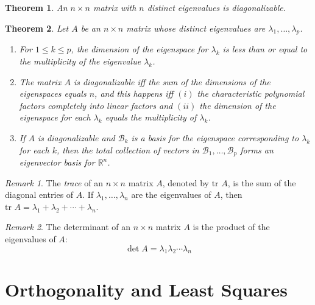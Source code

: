 \documentclass{article}
\theoremstyle{plain}
\newtheorem{thm}{Theorem}[section]
\theoremstyle{definition}
\theoremstyle{remark}
\newtheorem*{rem}{Remark}
\begin{document}
\begin{thm}
    An \(n\times n\) matrix with \(n\) distinct eigenvalues is diagonalizable.
\end{thm}

\begin{thm}
    Let \(A\) be an \(n\times n\) matrix whose distinct eigenvalues are \(\lambda_1,\ldots,\lambda_p\).
    \begin{enumerate}
        \item[a.] For \(1\leq k\leq p\), the dimension of the eigenspace for \(\lambda_k\) is less than or equal to the multiplicity of the eigenvalue \(\lambda_k\).
        \item[b.] The matrix \(A\) is diagonalizable iff the sum of the dimensions of the eigenspaces equals \(n\), and this happens iff \((i)\) the characteristic polynomial factors completely into linear factors and \((ii)\) the dimension of the eigenspace for each \(\lambda_k\) equals the multiplicity of \(\lambda_k\).
        \item[c.] If \(A\) is diagonalizable and \(\mathcal{B}_k\) is a basis for the eigenspace corresponding to \(\lambda_k\) for each \(k\), then the total collection of vectors in \(\mathcal{B}_1,\ldots,\mathcal{B}_p\) forms an eigenvector basis for \(\mathbb{R}^n\).
    \end{enumerate}
\end{thm}

\begin{rem}
    The \emph{trace} of an \(n\times n\) matrix \(A\), denoted by \(\text{tr }A\), is the sum of the diagonal entries of \(A\). If \(\lambda_1,\ldots,\lambda_n\) are the eigenvalues of \(A\), then \(\text{tr }A=\lambda_1+\lambda_2+\cdots+\lambda_n\).
\end{rem}

\begin{rem}
    The determinant of an \(n\times n\) matrix \(A\) is the product of the eigenvalues of \(A\): \[\det A=\lambda_1\lambda_2\cdots\lambda_n\]
\end{rem}

\section{Orthogonality and Least Squares}
\end{document}
